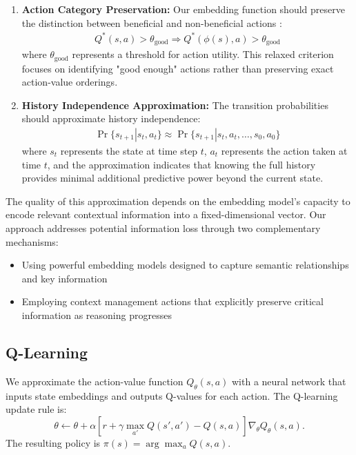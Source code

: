 \documentclass[10pt,journal,compsoc]{IEEEtran}
\begin{document}
\begin{enumerate}
\item \textbf{Action Category Preservation:} Our embedding function should preserve the distinction between beneficial and non-beneficial actions \citep{li2006towards}:
\begin{align}
Q^*(s, a) > \theta_{\text{good}} \Rightarrow Q^*(\phi(s), a) > \theta_{\text{good}}
\end{align}
where $\theta_{\text{good}}$ represents a threshold for action utility. This relaxed criterion focuses on identifying "good enough" actions rather than preserving exact action-value orderings.

\item \textbf{History Independence Approximation:} The transition probabilities should approximate history independence:
\begin{align}
\Pr\{s_{t+1} | s_t, a_t\} \approx \Pr\{s_{t+1} | s_t, a_t, \ldots, s_0, a_0\}
\end{align}
where $s_t$ represents the state at time step $t$, $a_t$ represents the action taken at time $t$, and the approximation indicates that knowing the full history provides minimal additional predictive power beyond the current state.
\end{enumerate}

The quality of this approximation depends on the embedding model's capacity to encode relevant contextual information into a fixed-dimensional vector. Our approach addresses potential information loss through two complementary mechanisms:
\begin{itemize}
\item Using powerful embedding models designed to capture semantic relationships and key information
\item Employing context management actions that explicitly preserve critical information as reasoning progresses
\end{itemize}

\subsection{Q-Learning}

We approximate the action-value function $Q_\theta(s,a)$ with a
neural network that inputs state embeddings and outputs Q-values for
each action. The Q-learning update rule is:
\[
\theta \leftarrow \theta +
\alpha \left[ r + \gamma \max_{a'} Q(s',a') - Q(s,a) \right] \nabla_\theta Q_\theta(s,a).
\]
The resulting policy is $\pi(s) = \arg\max_a Q(s,a)$.
\end{document}
